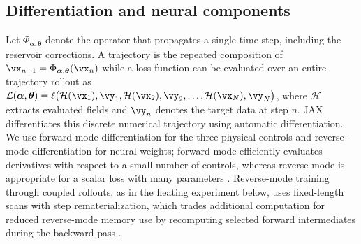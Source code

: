 \documentclass{article} %
\begin{document}
\subsection{Differentiation and neural components}\label{sec:differentiation}

Let \(\Phi_{\boldsymbol{\alpha},\boldsymbol{\theta}}\) denote the operator that propagates a single time step, including the reservoir corrections. A trajectory is the repeated composition of $\vx_{n+1}=\Phi_{\boldsymbol{\alpha},\boldsymbol{\theta}}(\vx_n)$ while a loss function can be evaluated over an entire trajectory rollout as $\mathcal{L}(\boldsymbol{\alpha},\boldsymbol{\theta})=\ell\bigl(\mathcal{H}(\vx_1),\vy_1,\mathcal{H}(\vx_2),\vy_2,\ldots,\mathcal{H}(\vx_N),\vy_N\bigr)$, where \(\mathcal{H}\) extracts evaluated fields and \(\vy_n\) denotes the target data at step \(n\). JAX differentiates this discrete numerical trajectory using automatic differentiation. We use forward-mode differentiation for the three physical controls and reverse-mode differentiation for neural weights; forward mode efficiently evaluates derivatives with respect to a small number of controls, whereas reverse mode is appropriate for a scalar loss with many parameters \citep{baydin2018autodiff,jax2024autodiff}. Reverse-mode training through coupled rollouts, as in the heating experiment below, uses fixed-length scans with step rematerialization, which trades additional computation for reduced reverse-mode memory use by recomputing selected forward intermediates during the backward pass \citep{jax2024checkpoint}.
\end{document}
